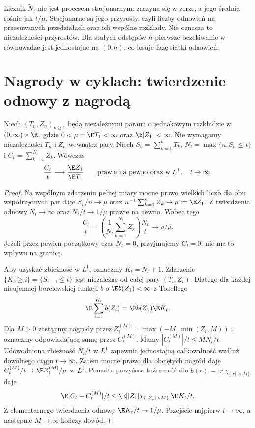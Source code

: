 \begin{uwaga}
Licznik $\widetilde N_t$ nie jest procesem
stacjonarnym: zaczyna się w zerze, a jego średnia
rośnie jak $t/\mu$. Stacjonarne są jego przyrosty,
czyli liczby odnowień na przesuwanych przedziałach
oraz ich wspólne rozkłady. Nie oznacza to
niezależności przyrostów. Dla stałych odstępów $h$
pierwsze oczekiwanie w równowadze jest jednostajne
na $(0,h)$, co losuje fazę siatki odnowień.
\end{uwaga}

\section{Nagrody w cyklach: twierdzenie odnowy z nagrodą}
\begin{twierdzenie}
Niech $(T_n,Z_n)_{n\ge1}$ będą niezależnymi parami o jednakowym
rozkładzie w $(0,\infty)\times\R$, gdzie
$0<\mu=\E T_1<\infty$ oraz $\E|Z_1|<\infty$.
Nie wymagamy niezależności $T_n$ i $Z_n$ wewnątrz pary.
Niech $S_n=\sum_{k=1}^nT_k$, $N_t=\max\{n:S_n\le t\}$ i
$C_t=\sum_{k=1}^{N_t}Z_k$. Wówczas
\[
\frac{C_t}{t}\longrightarrow\frac{\E Z_1}{\E T_1}
\qquad\text{prawie na pewno oraz w }L^1,\quad t\to\infty.
\]
\end{twierdzenie}
\begin{proof}
Na wspólnym zdarzeniu pełnej miary mocne prawo wielkich liczb
dla obu współrzędnych par daje
$S_n/n\to\mu$ oraz $n^{-1}\sum_{k=1}^nZ_k\to\rho:=\E Z_1$.
Z twierdzenia odnowy $N_t\to\infty$ oraz
$N_t/t\to1/\mu$ prawie na pewno. Wobec tego
\[
\frac{C_t}{t}=
\left(\frac{1}{N_t}\sum_{k=1}^{N_t}Z_k\right)
\frac{N_t}{t}\longrightarrow\rho/\mu.
\]
Jeżeli przez pewien początkowy czas $N_t=0$, przyjmujemy
$C_t=0$; nie ma to wpływu na granicę.

Aby uzyskać zbieżność w $L^1$, oznaczmy $K_t=N_t+1$.
Zdarzenie $\{K_t\ge i\}=\{S_{i-1}\le t\}$
jest niezależne od całej pary $(T_i,Z_i)$.
Dlatego dla każdej nieujemnej borelowskiej funkcji
$b$ o $\E b(Z_1)<\infty$ z Tonellego
\[
\E\sum_{i=1}^{K_t}b(Z_i)=\E b(Z_1)\E K_t.
\]
Dla $M>0$ zastąpmy nagrody przez
$Z_i^{(M)}=\max(-M,\min(Z_i,M))$ i oznaczmy
odpowiadającą sumę przez $C_t^{(M)}$.
Mamy $|C_t^{(M)}|/t\le M N_t/t$.
Udowodniona zbieżność $N_t/t$ w $L^1$ zapewnia
jednostajną całkowalność wzdłuż dowolnego ciągu
$t\to\infty$. Zatem mocne prawo dla obciętych
nagród daje $C_t^{(M)}/t\to\E Z_1^{(M)}/\mu$
w $L^1$.
Ponadto powyższa tożsamość dla
$b(r)=|r|\chi_{\{|r|>M\}}$ daje
\[
\E|C_t-C_t^{(M)}|/t
\le \E[|Z_1|\chi_{\{|Z_1|>M\}}]\E K_t/t.
\]
Z elementarnego twierdzenia odnowy
$\E K_t/t\to1/\mu$. Przejście najpierw $t\to\infty$,
a następnie $M\to\infty$ kończy dowód.
\end{proof}

